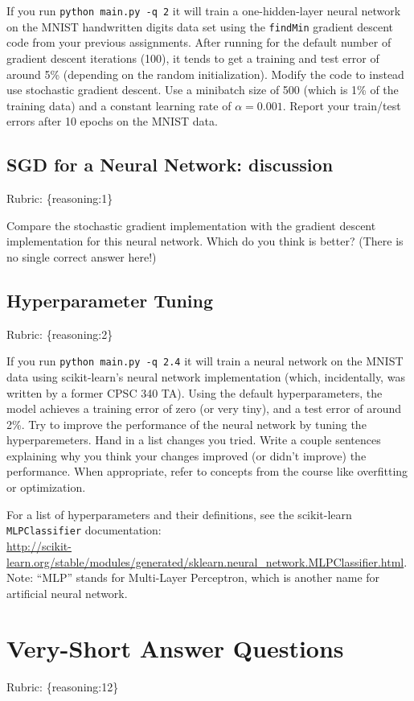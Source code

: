 \documentclass{article}
\def\rubric#1{\gre{Rubric: \{#1\}}}{}
\def\blu#1{{\color{blu}#1}}
\def\gre#1{{\color{gre}#1}}
\begin{document}
If you run \texttt{python main.py -q 2} it will train a one-hidden-layer neural network on the MNIST handwritten digits data set using the \texttt{findMin} gradient descent code from your previous assignments. After running for the default number of gradient descent iterations (100), it tends to get a training and test error of around 5\% (depending on the random initialization). 
\blu{Modify the code to instead use stochastic gradient descent. Use a minibatch size of 500 (which is 1\% of the training data) and a constant learning rate of $\alpha=0.001$. Report your train/test errors after 10 epochs on the MNIST data.} 

\subsection{SGD for a Neural Network: discussion}
\rubric{reasoning:1}

Compare the stochastic gradient implementation with the gradient descent implementation for this neural network. Which do you think is better? (There is no single correct answer here!) 

\subsection{Hyperparameter Tuning}
\rubric{reasoning:2}

If you run \texttt{python main.py -q 2.4} it will train a neural network on the MNIST data using scikit-learn's neural network implementation (which, incidentally, was written by a former CPSC 340 TA).
Using the default hyperparameters, the model achieves a training error of zero (or very tiny), and a test error of around 2\%. 
Try to improve the performance of the neural network by tuning the hyperparemeters.
\blu{Hand in a list changes you tried. Write a couple sentences explaining why you think your changes improved (or didn't improve) the performance. When appropriate, refer to concepts from the course like overfitting or optimization.}

For a list of hyperparameters and their definitions, see the scikit-learn \texttt{MLPClassifier} documentation:\\
\url{http://scikit-learn.org/stable/modules/generated/sklearn.neural_network.MLPClassifier.html}. Note: ``MLP'' stands for Multi-Layer Perceptron,
which is another name for artificial neural network.

\section{Very-Short Answer Questions}
\rubric{reasoning:12}
\end{document}
